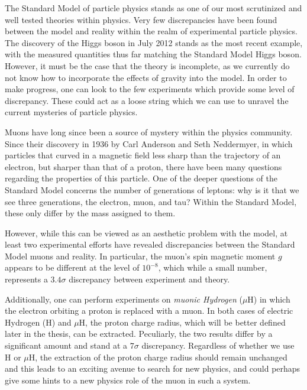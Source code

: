 \label{chapter:introduction}

The Standard Model of particle physics stands as one of our most scrutinized and well tested theories within physics. Very few discrepancies have been found between the model and reality within the realm of experimental particle physics. The discovery of the Higgs boson in July 2012 stands as the most recent example, with the measured quantities thus far matching the Standard Model Higgs boson. However, it must be the case that the theory is incomplete, as we currently do not know how to incorporate the effects of gravity into the model. In order to make progress, one can look to the few experiments which provide some level of discrepancy. These could act as a loose string which we can use to unravel the current mysteries of particle physics.

Muons have long since been a source of mystery within the physics community. Since their discovery in 1936 by Carl Anderson and Seth Neddermyer, in which particles that curved in a magnetic field less sharp than the trajectory of an electron, but sharper than that of a proton, there have been many questions regarding the properties of this particle. One of the deeper questions of the Standard Model concerns the number of generations of leptons: why is it that we see three generations, the electron, muon, and tau? Within the Standard Model, these only differ by the mass assigned to them.

However, while this can be viewed as an aesthetic problem with the model, at least two experimental efforts have revealed discrepancies between the Standard Model muons and reality. In particular, the muon's spin magnetic moment $g$ appears to be different at the level of $10^{-8}$, which while a small number, represents a $3.4\sigma$ discrepancy between experiment and theory.\cite{2007PhLB..649..173H}

Additionally, one can perform experiments on \emph{muonic Hydrogen} ($\mu\textrm{H}$) in which the electron orbiting a proton is replaced with a muon. In both cases of electric Hydrogen (H) and $\mu\textrm{H}$, the proton charge radius, which will be better defined later in the thesis, can be extracted. Peculiarly, the two results differ by a significant amount  and stand at a $7\sigma$ discrepancy.\cite{Carlson:2015jba} Regardless of whether we use H or $\mu\textrm{H}$, the extraction of the proton charge radius should remain unchanged and this leads to an exciting avenue to search for new physics, and could perhaps give some hints to a new physics role of the muon in such a system.


